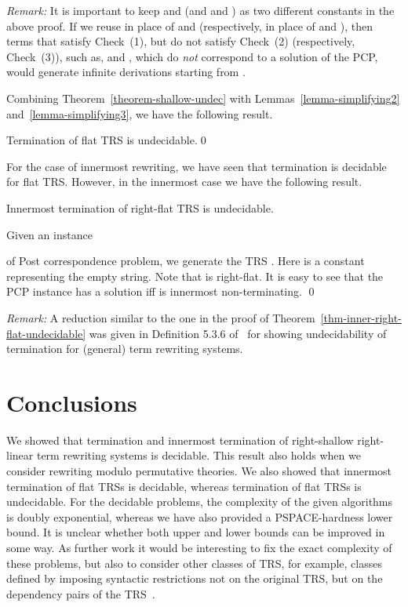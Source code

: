 \documentclass{LMCS}
\theoremstyle{plain}
\begin{document}
\noindent
{\em Remark:}
It is important to keep  and  (and  and ) as two different
constants in the above proof.  If we reuse  in place of  and 
(respectively,  in place of  and ),
then terms that satisfy Check~(1), but do not satisfy Check~(2) 
(respectively, Check~(3)), such as, 
 and , 
which do {\em{not}} correspond to a solution of the PCP,
would generate infinite derivations  starting from .

Combining Theorem~\ref{theorem-shallow-undec} with 
Lemmas~\ref{lemma-simplifying2}
and~\ref{lemma-simplifying3}, we have the following result.


\begin{thm}\label{theorem-flat-undec}
Termination of flat TRS is undecidable.\qed
\end{thm}

For the case of innermost rewriting, we have
seen that termination is decidable for flat TRS.
However, in the innermost case we have the following result.

\begin{thm}\label{thm-inner-right-flat-undecidable}
Innermost termination
of right-flat TRS is undecidable.
\end{thm}
\proof
Given an instance 

of Post correspondence problem,
we generate the TRS
.
Here  is a constant representing the empty string.
Note that  is right-flat.
It is easy to see that the PCP instance has a solution
iff  is innermost non-terminating.
\qed


\noindent
{\em Remark:}
A reduction similar to the one in the proof of 
Theorem~\ref{thm-inner-right-flat-undecidable}
was given in Definition 5.3.6 of~\cite{TeReSe} for
showing undecidability of termination for 
(general) term rewriting systems.

\section{Conclusions}

\noindent We showed that termination and innermost termination 
of right-shallow right-linear term rewriting systems
is decidable.
This result also holds when we consider rewriting modulo permutative
theories.
We also showed that innermost termination of flat TRSs
is decidable, whereas termination of flat TRSs is undecidable.
For the decidable problems,
the complexity of the given algorithms
is doubly exponential, whereas we have also
provided a PSPACE-hardness lower bound.
It is unclear whether both upper and lower bounds can be improved
in some way. As further work it would be interesting
to fix the exact complexity of these problems, but also to
consider other classes of TRS,  for example, classes defined 
by imposing syntactic restrictions not on the original TRS,
but on the dependency pairs of the TRS~\cite{Sakai06,Sakai}.
\end{document}
